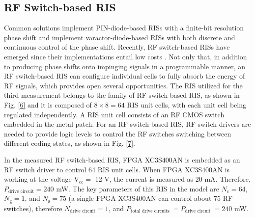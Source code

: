 \documentclass[journal]{IEEEtran}
\begin{document}
\subsection{RF Switch-based RIS}

Common solutions implement PIN-diode-based RISs with a finite-bit resolution phase shift and implement varactor-diode-based RISs with both discrete and continuous control of the phase shift. Recently, RF switch-based RISs have emerged since their implementations entail low costs \cite{rossanese2022designing}. Not only that, in addition to producing phase shifts onto impinging signals in a programmable manner, an RF switch-based RIS can configure individual cells to fully absorb the energy of RF signals, which provides open several opportunities. 
The RIS utilized for the third measurement belongs to the family of RF switch-based RIS, as shown in Fig. \ref{6} and it is composed of $8 \times 8=64$ RIS unit cells, with each unit cell being regulated independently. A RIS unit cell consists of an RF CMOS switch embedded in the metal patch. For an RF switch-based RIS, RF switch drivers are needed to provide logic levels to control the RF switches switching between different coding states, as shown in Fig. \ref{7}. 

In the measured RF switch-based RIS, FPGA XC3S400AN is embedded as an RF switch driver to control 64 RIS unit cells. When FPGA XC3S400AN is working at the voltage $\mathrm{V}_\text {cc} =$ 12 V, the current is measured as 20 mA. Therefore, $P_{\text {drive circuit}} = 240 $ mW.  The key parameters of this RIS in the model are $N_{\mathrm{c}}=64$, $N_{\mathrm{g}}=1$, and $N_{\mathrm{s}}=75$ (a single FPGA XC3S400AN can control about 75 RF switches), therefore $N_{\text {drive circuit}}= 1$, and $P_{\text {total drive circuits }}= P_{\text {drive circuit }} = 240$ mW. 
\end{document}
